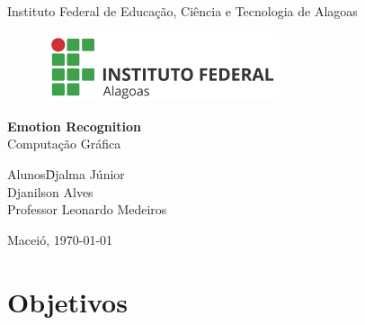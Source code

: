 \documentclass[a4paper, 12pt]{article}
\begin{document}
  
\begin{titlepage}
\begin{center}
  \huge{Instituto Federal de Educação, Ciência e Tecnologia de Alagoas}
  
  \vspace{10pt}
  \begin{figure}[!ht]
    \centering
    \includegraphics[height=2cm, width=7cm]{logo.jpg}
  \end{figure}
  
  \vspace{85pt}
  
  \textbf{\LARGE{Emotion Recognition}}\\
  \large{Computação Gráfica}
  \vspace{160pt}
  
\end{center}

\begin{flushleft}
  \begin{tabbing}
    Alunos\qquad\qquad\= Djalma Júnior\\
    \>Djanilson Alves\\
    Professor\> Leonardo Medeiros \\
  \end{tabbing}
\end{flushleft}

\begin{center}
  \vspace{\fill}
  Maceió, \today
\end{center}
\end{titlepage}


\newpage
\tableofcontents
\thispagestyle{empty}

\newpage
{}


\section{Objetivos}
\end{document}
